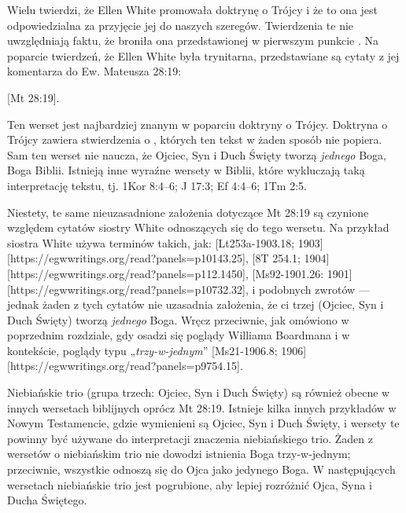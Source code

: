 
Wielu twierdzi, że Ellen White promowała doktrynę o Trójcy i że to ona jest odpowiedzialna za przyjęcie jej do naszych szeregów. Twierdzenia te nie uwzględniają faktu, że broniła ona  przedstawionej w pierwszym punkcie . Na poparcie twierdzeń, że Ellen White była trynitarna, przedstawiane są cytaty z jej komentarza do Ew. Mateusza 28:19:

[Mt 28:19].

Ten werset jest najbardziej znanym w poparciu doktryny o Trójcy. Doktryna o Trójcy zawiera stwierdzenia o , których ten tekst w żaden sposób nie popiera. Sam ten werset nie naucza, że Ojciec, Syn i Duch Święty tworzą \textit{jednego} Boga, Boga Biblii. Istnieją inne wyraźne wersety w Biblii, które wykluczają taką interpretację tekstu, tj. 1Kor 8:4--6; J 17:3; Ef 4:4--6; 1Tm 2:5.

Niestety, te same nieuzasadnione założenia dotyczące Mt 28:19 są czynione względem cytatów siostry White odnoszących się do tego wersetu. Na przykład siostra White używa terminów takich, jak: [Lt253a-1903.18; 1903][https://egwwritings.org/read?panels=p10143.25], [8T 254.1; 1904][https://egwwritings.org/read?panels=p112.1450], [Ms92-1901.26: 1901][https://egwwritings.org/read?panels=p10732.32], i podobnych zwrotów — jednak żaden z tych cytatów nie uzasadnia założenia, że ci trzej (Ojciec, Syn i Duch Święty) tworzą \textit{jednego} Boga. Wręcz przeciwnie, jak omówiono w poprzednim rozdziale, gdy osadzi się poglądy Williama Boardmana  i  w kontekście, poglądy typu „\textit{trzy-w-jednym}”  [Ms21-1906.8; 1906][https://egwwritings.org/read?panels=p9754.15].

Niebiańskie trio (grupa trzech: Ojciec, Syn i Duch Święty) są również obecne w innych wersetach biblijnych oprócz Mt 28:19. Istnieje kilka innych przykładów w Nowym Testamencie, gdzie wymienieni są Ojciec, Syn i Duch Święty, i wersety te powinny być używane do interpretacji znaczenia niebiańskiego trio. Żaden z wersetów o niebiańskim trio nie dowodzi istnienia Boga trzy-w-jednym; przeciwnie, wszystkie odnoszą się do Ojca jako jedynego Boga. W następujących wersetach niebiańskie trio jest pogrubione, aby lepiej rozróżnić Ojca, Syna i Ducha Świętego.

